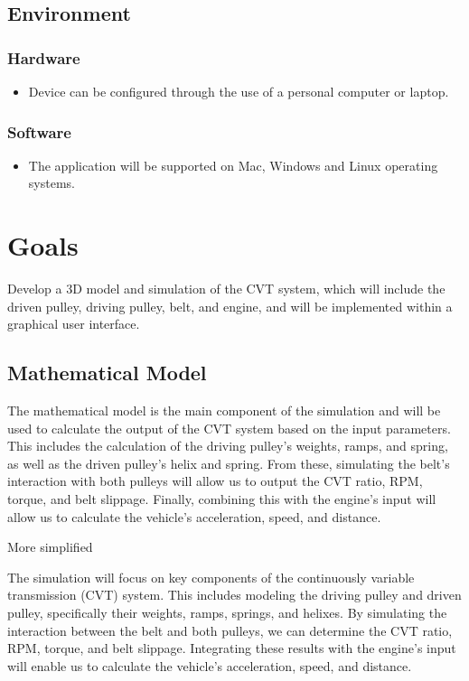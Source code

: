 \documentclass{article}
\begin{document}
\subsection{Environment}
\subsubsection{Hardware}
\begin{itemize}
    \item Device can be configured through the use of a personal computer or laptop.
\end{itemize}
    \subsubsection{Software}
\begin{itemize}
    \item The application will be supported on Mac, Windows and Linux operating
    systems.
\end{itemize}

\section{Goals}

Develop a 3D model and simulation of the CVT system, which will include the driven pulley, 
driving pulley, belt, and engine, and will be implemented within a graphical user interface.

\subsection{Mathematical Model}
The mathematical model is the main component of the simulation and will be used to 
calculate the output of the CVT system based on the input parameters.
This includes the calculation of the driving pulley's weights, ramps, and spring, 
as well as the driven pulley's helix and spring.
From these, simulating the belt's interaction with both pulleys will allow us to output 
the CVT ratio, RPM, torque, and belt slippage. Finally, combining this with the engine's input
will allow us to calculate the vehicle's acceleration, speed, and distance.

More simplified

The simulation will focus on key components of the continuously variable transmission (CVT) 
system. This includes modeling the driving pulley and driven pulley, specifically their weights,
ramps, springs, and helixes. By simulating the interaction between the belt and both pulleys, 
we can determine the CVT ratio, RPM, torque, and belt slippage. Integrating these results with 
the engine's input will enable us to calculate the vehicle's acceleration, speed, and distance.
\end{document}
